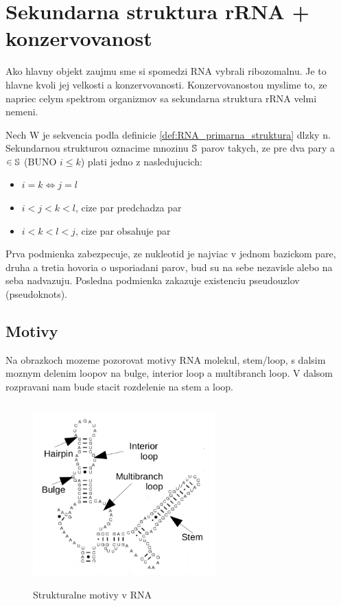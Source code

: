 
\section{Sekundarna struktura rRNA + konzervovanost}

Ako hlavny objekt zaujmu sme si spomedzi RNA vybrali ribozomalnu.
Je to hlavne kvoli jej velkosti a konzervovanosti.
Konzervovanostou myslime to, ze napriec celym spektrom organizmov sa sekundarna struktura
rRNA velmi nemeni. 

\begin{definice}\label{def:RNA_sekundarna_struktura}
	Nech W je sekvencia podla definicie \ref{def:RNA_primarna_struktura} dlzky n.
	Sekundarnou strukturou oznacime mnozinu $\mathbb{S}$ parov  takych, ze
	pre dva pary  a  $\in \mathbb{S}$ (BUNO $i \leq k$) plati jedno z nasledujucich:
	\begin{itemize}
		\item $i = k \iff j = l$
		\item $i < j < k < l$, cize par  predchadza par 
		\item $i < k < l < j$, cize par  obsahuje par 
	\end{itemize}
\end{definice}
Prva podmienka zabezpecuje, ze nukleotid je najviac v jednom bazickom pare, druha a tretia
hovoria o usporiadani parov, bud su na sebe nezavisle alebo na seba nadvazuju.
Posledna podmienka zakazuje existenciu pseudouzlov (pseudoknots).


\subsection{Motivy}

Na obrazkoch mozeme pozorovat motivy RNA molekul, stem/loop, s dalsim
moznym delenim loopov na bulge, interior loop a multibranch loop.
V dalsom rozpravani nam bude stacit rozdelenie na stem a loop.


\begin{figure}[H]
\centering
\includegraphics[width=70mm, height=70mm]{../img/struktury_v_rna.png}
\caption{Strukturalne motivy v RNA}
\label{obr:RNA_motifs}
\end{figure}

